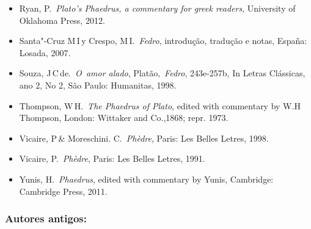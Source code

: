 {\begin{itemize}
\item
  Ryan, P.~\emph{Plato's Phaedrus, a commentary for greek readers},
  University of Oklahoma Press, 2012.
\item
  Santa"-Cruz M\,I\,y Crespo, M\,I.~\emph{Fedro}, introdução, tradução e
  notas, España: Losada, 2007.
\item
  Souza, J\,C\,de.~\emph{O~amor alado}, Platão,~\emph{Fedro}, 243e-257b,
  In Letras Clássicas, ano 2, No 2, São Paulo: Humanitas, 1998.
\item
  Thompson, W\,H.~\emph{The Phaedrus of Plato}, edited with commentary
  by W.H\,Thompson, London: Wittaker and Co.,1868; repr. 1973.
\item
  Vicaire, P\,\& Moreschini. C.~\emph{Phèdre}, Paris: Les Belles Letres,
  1998.
\item
  Vicaire, P.~\emph{Phèdre}, Paris: Les Belles Letres, 1991.
\item
  Yunis, H.~\emph{Phaedrus}, edited with commentary by Yunis, Cambridge:
  Cambridge Press, 2011.
\end{itemize}

 

\subsubsection{Autores antigos:}

 

}
